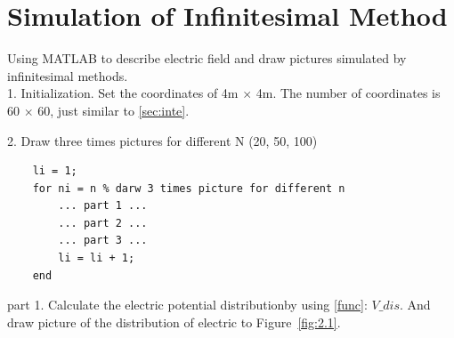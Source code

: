 \documentclass[10pt, journal, final]{IEEEtran}
\begin{document}
\section{
  Simulation of Infinitesimal Method
 }
\label{sec:inf}

Using MATLAB to describe electric field and draw pictures
simulated by infinitesimal methods.\\
1. Initialization. Set the coordinates of 4m $\times$ 4m.
The number of coordinates is 60 $\times$ 60,
just similar to \ref{sec:inte}.

\label{work2.1}

2. Draw three times pictures for different N (20, 50, 100)
\begin{lstlisting}
    li = 1;
    for ni = n % darw 3 times picture for different n
        ... part 1 ...
        ... part 2 ...
        ... part 3 ...
        li = li + 1;
    end
\end{lstlisting}

part 1. Calculate the electric potential distributionby using \ref{func}: $V\_dis$.
And draw picture of the distribution of electric to Figure~\ref{fig:2.1}.

\label{work1.3}
\end{document}
